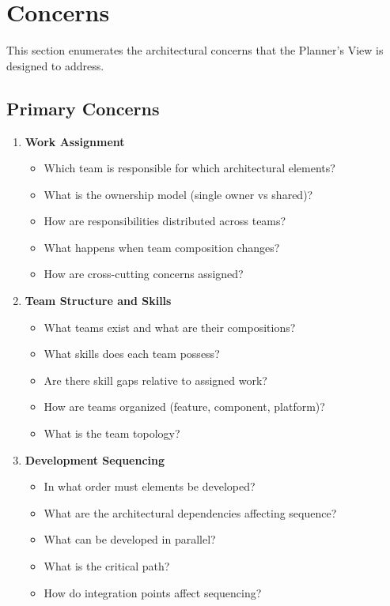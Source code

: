 \documentclass[11pt,letterpaper]{article}
\begin{document}
\section{Concerns}

This section enumerates the architectural concerns that the Planner's View is designed to address.

\subsection{Primary Concerns}

\begin{enumerate}[label=\textbf{C\arabic*:}, leftmargin=2.5em]
    \item \textbf{Work Assignment}
    \begin{itemize}[nosep]
        \item Which team is responsible for which architectural elements?
        \item What is the ownership model (single owner vs shared)?
        \item How are responsibilities distributed across teams?
        \item What happens when team composition changes?
        \item How are cross-cutting concerns assigned?
    \end{itemize}
    
    \item \textbf{Team Structure and Skills}
    \begin{itemize}[nosep]
        \item What teams exist and what are their compositions?
        \item What skills does each team possess?
        \item Are there skill gaps relative to assigned work?
        \item How are teams organized (feature, component, platform)?
        \item What is the team topology?
    \end{itemize}
    
    \item \textbf{Development Sequencing}
    \begin{itemize}[nosep]
        \item In what order must elements be developed?
        \item What are the architectural dependencies affecting sequence?
        \item What can be developed in parallel?
        \item What is the critical path?
        \item How do integration points affect sequencing?
    \end{itemize}
    

\end{enumerate}
\end{document}
